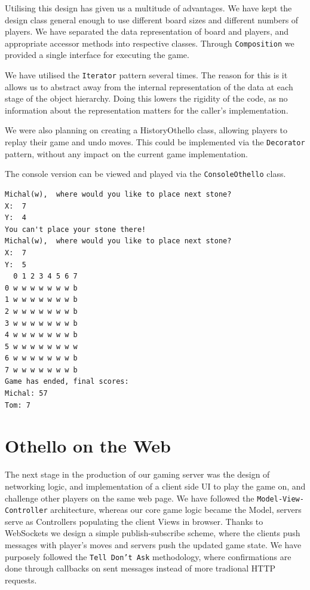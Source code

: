 \documentclass[a4wide, 11pt]{article}
\begin{document}
Utilising this design has given us a multitude of advantages. We have kept the design class general enough to use different board sizes and different numbers of players. We have separated the data representation of board and players, and appropriate accessor methods into respective classes. Through \texttt{Composition} we provided a single interface for executing the game.

We have utilised the \texttt{Iterator} pattern several times. The reason for this is it allows us to abstract away from the internal representation of the data at each stage of the object hierarchy. Doing this lowers the rigidity of the code, as no information about the representation matters for the caller's implementation.

We were also planning on creating a HistoryOthello class, allowing players to replay their game and undo moves. This could be implemented via the \texttt{Decorator} pattern, without any impact on the current game implementation.

The console version can be viewed and played via the \texttt{ConsoleOthello} class.

\begin{verbatim}
Michal(w),  where would you like to place next stone?
X:  7
Y:  4
You can't place your stone there!
Michal(w),  where would you like to place next stone?
X:  7
Y:  5
  0 1 2 3 4 5 6 7
0 w w w w w w w b
1 w w w w w w w b
2 w w w w w w w b
3 w w w w w w w b
4 w w w w w w w b
5 w w w w w w w w
6 w w w w w w w b
7 w w w w w w w b
Game has ended, final scores:
Michal: 57
Tom: 7
\end{verbatim}
\section{Othello on the Web}

The next stage in the production of our gaming server was the design of networking logic, and implementation of a client side UI to play the game on, and challenge other players on the same web page. We have followed the \texttt{Model-View-Controller} architecture, whereas our core game logic became the Model, servers serve as Controllers populating the client Views in browser. Thanks to WebSockets we design a simple publish-subscribe scheme, where the clients push messages with player's moves and servers push the updated game state. We have purposely followed the \texttt{Tell Don't Ask} methodology, where confirmations are done through callbacks on sent messages instead of more tradional HTTP requests.
\end{document}
